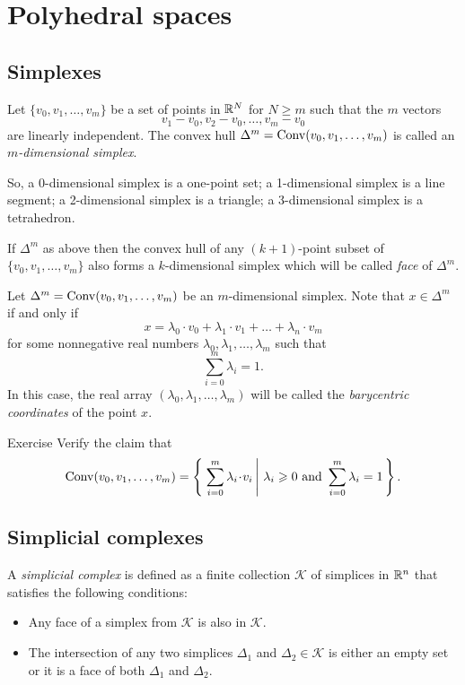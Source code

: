 \chapter{Polyhedral spaces}\label{chap:triangulation}




\section{Simplexes}

Let $\{v_0,v_1,\dots,v_m\}$ be a set of points in $\mathbb{R}^N$ for $N\ge m$
such that the $m$ vectors 
$$v_1-v_0, v_2-v_0,\dots,v_m-v_0$$ 
are linearly independent.
The convex hull $\Delta^m=\operatorname{Conv}(v_0,v_1,\dots,v_m)$
is called an \emph{$m$-dimensional simplex}.

So,
a 0-dimensional simplex is a one-point set; 
a 1-dimensional simplex is a line segment;
a 2-dimensional simplex is a triangle;
a 3-dimensional simplex is a tetrahedron.

If $\Delta^m$ as above
then the convex hull of any $(k+1)$-point subset of $\{v_0,v_1,\dots,v_m\}$ also forms a $k$-dimensional simplex which will be called \emph{face} of $\Delta^m$.


Let $\Delta^m=\operatorname{Conv}(v_0,v_1,\dots,v_m)$ be an $m$-dimensional simplex.
Note that $x\in \Delta^m$ if and only if 
$$x=\lambda_0\cdot v_0+\lambda_1\cdot v_1+\dots+\lambda_n\cdot v_m$$
for some nonnegative real numbers $\lambda_0,\lambda_1,\dots,\lambda_m$ such that
$$\sum_{i=0}^m\lambda_i=1.$$
In this case, the real array $(\lambda_0,\lambda_1,\dots,\lambda_m)$ will be called the \emph{barycentric coordinates} of the point $x$.

\begin{thm}{Exercise}\label{ex:convex-hull}
Verify the claim that $$\Conv(v_0,v_1,\dots,v_m) = \set{\sum_{i=0}^m \lambda_i \cdot v_i}{\lambda_i \ge 0 \textrm{ and } \sum_{i=0}^m \lambda_i = 1}.$$

\end{thm}




\section{Simplicial complexes}

A \emph{simplicial complex} is defined as a finite collection $\mathcal{K}$
of simplices in $\mathbb{R}^n$ that satisfies the following conditions:
\begin{itemize}
\item Any face of a simplex from $\mathcal{K}$ is also in $\mathcal{K}$.
\item The intersection of any two simplices $\Delta_1$ and $\Delta_2\in \mathcal{K}$ is either an empty set or it 
is a face of both $\Delta_1$ and $\Delta_2$.
\end{itemize}

